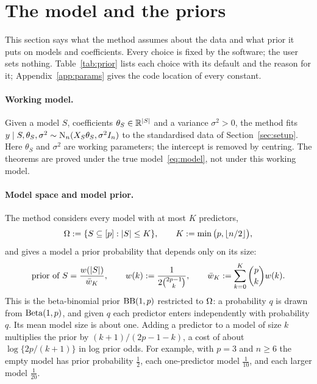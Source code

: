 \section{The model and the priors}\label{sec:method}\label{sec:prior}

This section says what the method assumes about the data and what prior it puts on models and coefficients. Every
choice is fixed by the software; the user sets nothing. Table~\ref{tab:prior} lists each choice with its default and
the reason for it; Appendix~\ref{app:params} gives the code location of every constant.

\paragraph{Working model.} Given a model $S$, coefficients $\theta_S\in\mathbb{R}^{\lvert S\rvert}$ and a variance $\sigma^2>0$, the
method fits $y\mid S,\theta_S,\sigma^2\sim\mathrm{N}_n(X_S\theta_S,\sigma^2I_n)$ to the standardised data of
Section~\ref{sec:setup}. Here $\theta_S$ and $\sigma^2$ are working parameters; the intercept is removed by centring.
The theorems are proved under the true model~\eqref{eq:model}, not under this working model.

\paragraph{Model space and model prior.} The method considers every model with at most $K$ predictors,
\begin{equation}\label{eq:space}
  \Omega:=\{S\subseteq[p]:\lvert S\rvert\le K\},\qquad K:=\min\big(p,\lfloor n/2\rfloor\big),
\end{equation}
and gives a model a prior probability that depends only on its size:
\begin{equation}\label{eq:modelprior}
  \text{prior of }S=\frac{w(\lvert S\rvert)}{\bar w_K},\qquad w(k):=\frac{1}{2\binom{2p-1}{k}},\qquad
  \bar w_K:=\sum_{k=0}^{K}\binom{p}{k}w(k).
\end{equation}
This is the beta-binomial prior $\mathrm{BB}(1,p)$ \citep{ScottBerger2010} restricted to $\Omega$: a probability $q$ is drawn from
$\mathrm{Beta}(1,p)$, and given $q$ each predictor enters independently with probability $q$. Its mean model size is about
one. Adding a predictor to a model of size $k$ multiplies the prior by $(k+1)/(2p-1-k)$, a cost of about
$\log\{2p/(k+1)\}$ in log prior odds. For example, with $p=3$ and $n\ge6$ the empty model has prior probability
$\tfrac12$, each one-predictor model $\tfrac1{10}$, and each larger model $\tfrac1{20}$.

